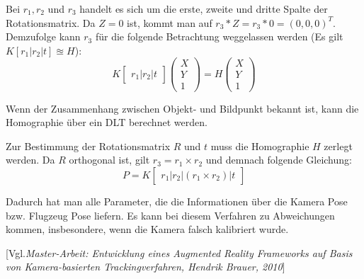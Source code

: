 \documentclass{ezb}
\begin{document}
Bei $r_{1}, r_{2}$ und $r_{3}$ handelt es sich um die erste, zweite und dritte Spalte der Rotationsmatrix. Da $Z=0$ ist, kommt man auf $r_{3} * Z = r_{3} * 0 = (0,0,0)^T$. Demzufolge kann $r_{3}$ für die folgende Betrachtung weggelassen werden (Es gilt $K[r_{1}|r_{2}|t] \approxeq H$):
\begin{equation}
K
\begin{bmatrix}
r_{1} | r_{2} | t 
\end{bmatrix}
\begin{pmatrix}
X \\
Y \\
1
\end{pmatrix}
=H
\begin{pmatrix}
X \\
Y \\
1
\end{pmatrix}
\end{equation} 

Wenn der Zusammenhang zwischen Objekt- und Bildpunkt bekannt ist, kann die Homographie über ein DLT berechnet werden. 

Zur Bestimmung der Rotationsmatrix $R$ und $t$ muss die Homographie $H$ zerlegt werden. Da $R$ orthogonal ist, gilt $r_3 = r_1 \times r_2$ und demnach folgende Gleichung:
\begin{equation}
P=K
\begin{bmatrix}
r_{1} | r_{2} | (r_1 \times r_2)| t 
\end{bmatrix}
\end{equation} 

Dadurch hat man alle Parameter, die die Informationen über die Kamera Pose bzw. Flugzeug Pose liefern. Es kann bei diesem Verfahren zu Abweichungen kommen, insbesondere, wenn die Kamera falsch kalibriert wurde.

[Vgl.\textit{Master-Arbeit: Entwicklung eines Augmented Reality
Frameworks auf Basis von Kamera-basierten
Trackingverfahren, Hendrik Brauer, 2010}]


\end{document}
